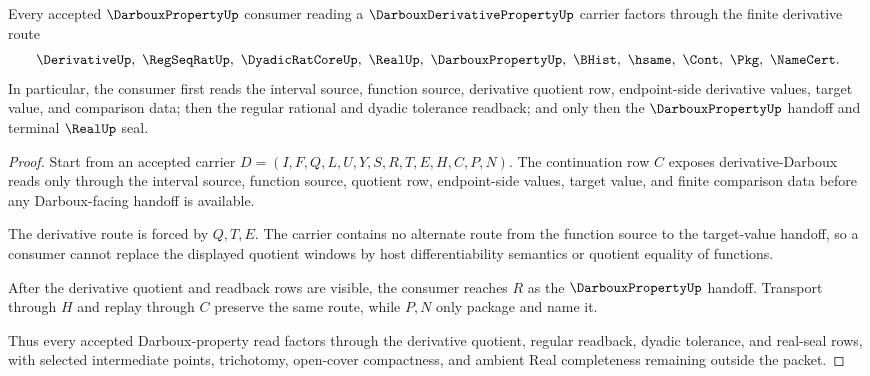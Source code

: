 \begin{theorem}
\label{thm:darboux-derivative-property-darboux-handoff}
Every accepted $\DarbouxPropertyUp$ consumer reading a $\DarbouxDerivativePropertyUp$ carrier factors through the finite derivative route
$$
\DerivativeUp,\ \RegSeqRatUp,\ \DyadicRatCoreUp,\ \RealUp,\ \DarbouxPropertyUp,\ \BHist,\ \hsame,\ \Cont,\ \Pkg,\ \NameCert .
$$
In particular, the consumer first reads the interval source, function source, derivative quotient row, endpoint-side derivative values, target value, and comparison data; then the regular rational and dyadic tolerance readback; and only then the $\DarbouxPropertyUp$ handoff and terminal $\RealUp$ seal.
\end{theorem}
\begin{proof}
Start from an accepted carrier $D=(I,F,Q,L,U,Y,S,R,T,E,H,C,P,N)$. The continuation row $C$ exposes derivative-Darboux reads only through the interval source, function source, quotient row, endpoint-side values, target value, and finite comparison data before any Darboux-facing handoff is available.

The derivative route is forced by $Q,T,E$. The carrier contains no alternate route from the function source to the target-value handoff, so a consumer cannot replace the displayed quotient windows by host differentiability semantics or quotient equality of functions.

After the derivative quotient and readback rows are visible, the consumer reaches $R$ as the $\DarbouxPropertyUp$ handoff. Transport through $H$ and replay through $C$ preserve the same route, while $P,N$ only package and name it.

Thus every accepted Darboux-property read factors through the derivative quotient, regular readback, dyadic tolerance, and real-seal rows, with selected intermediate points, trichotomy, open-cover compactness, and ambient Real completeness remaining outside the packet.
\end{proof}


